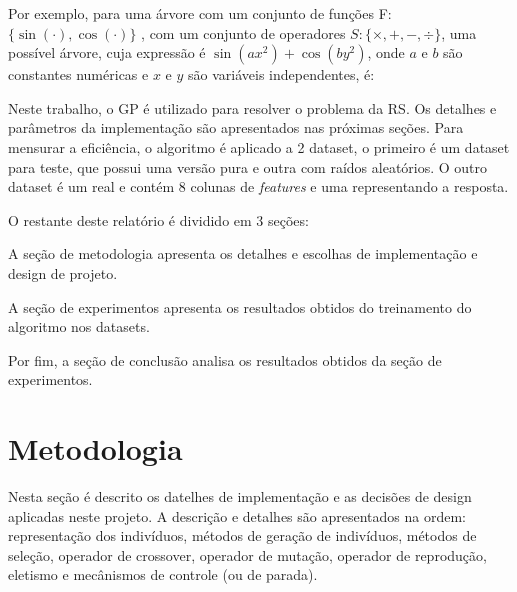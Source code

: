 \documentclass[a4paper]{paper}
\begin{document}
Por exemplo, para uma árvore com um conjunto de funções F:
$\{\sin(\cdot),\cos(\cdot)\}$ , com um conjunto de operadores $S: \{\times, + ,
-, \div\}$, uma possível árvore, cuja expressão é $\sin(ax^2)+\cos(by^2)$, onde
$a$ e $b$ são constantes numéricas e $x$ e $y$ são variáveis independentes, é:


\begin{center}
\end{center}

Neste trabalho, o GP é utilizado para resolver o problema da RS. Os detalhes e
parâmetros da implementação são apresentados nas próximas seções. Para mensurar
a eficiência, o algoritmo é aplicado a 2 dataset, o primeiro é um dataset para
teste, que possui uma versão pura e outra com raídos aleatórios. O outro dataset
é um real e contém 8 colunas de \textit{features} e uma representando a
resposta.

O restante deste relatório é dividido em 3 seções: 
\begin{ilist}
\item A seção de metodologia apresenta os detalhes e escolhas de implementação
  e design de projeto.
\item A seção de experimentos apresenta os resultados obtidos do treinamento
  do algoritmo nos datasets.
\item Por fim, a seção de conclusão analisa os resultados obtidos da seção de
  experimentos.
\end{ilist}

\section{Metodologia} \label{sec:metodologia}
Nesta seção é descrito os datelhes de implementação e as decisões de design
aplicadas neste projeto. A descrição e detalhes são apresentados na ordem:
representação dos indivíduos, métodos de geração de indivíduos, métodos de
seleção, operador de crossover, operador de mutação, operador de reprodução,
eletismo e mecânismos de controle (ou de parada).
\end{document}

